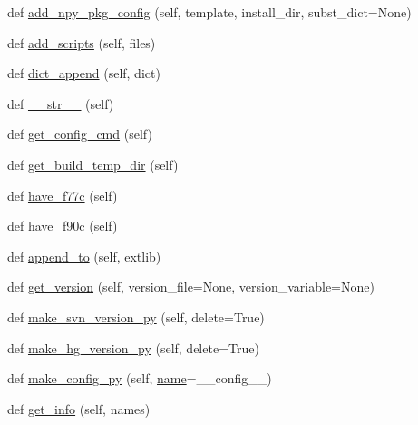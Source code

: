 \begin{DoxyCompactItemize}
\item 
def \hyperlink{classnumpy_1_1distutils_1_1misc__util_1_1Configuration_ac19bb7c78989483f4e9e7e65027c0af1}{add\+\_\+npy\+\_\+pkg\+\_\+config} (self, template, install\+\_\+dir, subst\+\_\+dict=None)
\item 
def \hyperlink{classnumpy_1_1distutils_1_1misc__util_1_1Configuration_a3b21909cbf25ecc2b7e3ceb948b16be4}{add\+\_\+scripts} (self, files)
\item 
def \hyperlink{classnumpy_1_1distutils_1_1misc__util_1_1Configuration_a8148d9d8c52604747ead6817c89979f3}{dict\+\_\+append} (self, dict)
\item 
def \hyperlink{classnumpy_1_1distutils_1_1misc__util_1_1Configuration_ac0a7c3cac5e0a4abcd9a011340601fe8}{\+\_\+\+\_\+str\+\_\+\+\_\+} (self)
\item 
def \hyperlink{classnumpy_1_1distutils_1_1misc__util_1_1Configuration_af73be786517ad8cdeead48482393b68b}{get\+\_\+config\+\_\+cmd} (self)
\item 
def \hyperlink{classnumpy_1_1distutils_1_1misc__util_1_1Configuration_adee01d309ce4467a0fe89bd6947812c5}{get\+\_\+build\+\_\+temp\+\_\+dir} (self)
\item 
def \hyperlink{classnumpy_1_1distutils_1_1misc__util_1_1Configuration_a7449411f59dba30fd12e5d4d80147275}{have\+\_\+f77c} (self)
\item 
def \hyperlink{classnumpy_1_1distutils_1_1misc__util_1_1Configuration_a3be96aeda2753efd0daf0bca3fe01e64}{have\+\_\+f90c} (self)
\item 
def \hyperlink{classnumpy_1_1distutils_1_1misc__util_1_1Configuration_ac13ebf51e3a16314602e64c7c8aa5e8b}{append\+\_\+to} (self, extlib)
\item 
def \hyperlink{classnumpy_1_1distutils_1_1misc__util_1_1Configuration_ae4125bcd75a775e0caa2d4675e6a22cc}{get\+\_\+version} (self, version\+\_\+file=None, version\+\_\+variable=None)
\item 
def \hyperlink{classnumpy_1_1distutils_1_1misc__util_1_1Configuration_affb728d6e6998bce8c606dc52ea75e66}{make\+\_\+svn\+\_\+version\+\_\+py} (self, delete=True)
\item 
def \hyperlink{classnumpy_1_1distutils_1_1misc__util_1_1Configuration_a8851f8b6adb79e3ea6b0bdcfd55f8980}{make\+\_\+hg\+\_\+version\+\_\+py} (self, delete=True)
\item 
def \hyperlink{classnumpy_1_1distutils_1_1misc__util_1_1Configuration_a847288ee91ad8fe53d12bdf25a29ed32}{make\+\_\+config\+\_\+py} (self, \hyperlink{classnumpy_1_1distutils_1_1misc__util_1_1Configuration_a0180c0a7786ccd3a68947c7b38d4a4b1}{name}=\textquotesingle{}\+\_\+\+\_\+config\+\_\+\+\_\+\textquotesingle{})
\item 
def \hyperlink{classnumpy_1_1distutils_1_1misc__util_1_1Configuration_a75e0dd6c000e00dd5adc7cbcd381e497}{get\+\_\+info} (self, names)
\end{DoxyCompactItemize}
